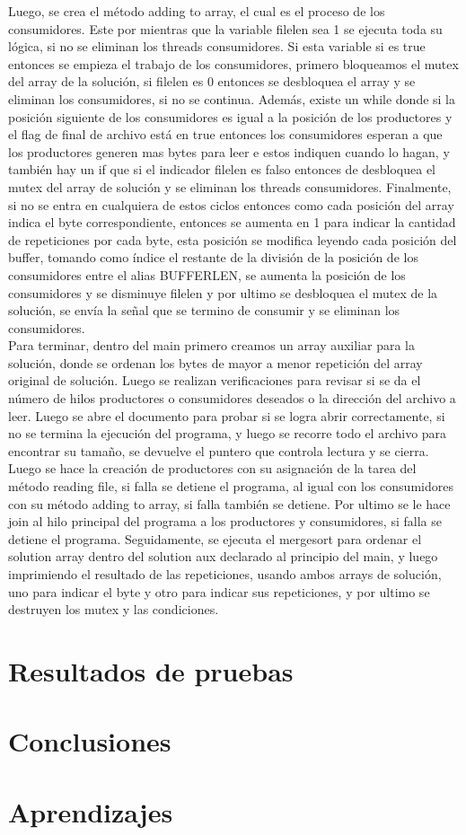 \documentclass[10pt, article, natbib]{IEEEtran}
\begin{document}
Luego, se crea el método adding to array, el cual es el proceso de los consumidores. Este por mientras que la variable filelen sea 1 se ejecuta toda su lógica, si no se eliminan los threads consumidores. Si esta variable si es true entonces se empieza el trabajo de los consumidores, primero bloqueamos el mutex del array de la solución, si filelen es 0 entonces se desbloquea el array y se eliminan los consumidores, si no se continua. Además, existe un while donde si la posición siguiente de los consumidores es igual a la posición de los productores y el flag de final de archivo está en true entonces los consumidores esperan a que los productores generen mas bytes para leer e estos indiquen cuando lo hagan, y también hay un if que si el indicador filelen es falso entonces de desbloquea el mutex del array de solución y se eliminan los threads consumidores. Finalmente, si no se entra en cualquiera de estos ciclos entonces como cada posición del array indica el byte correspondiente, entonces se aumenta en 1 para indicar la cantidad de repeticiones por cada byte, esta posición se modifica leyendo cada posición del buffer, tomando como índice el restante de la división de la posición de los consumidores entre el alias BUFFERLEN, se aumenta la posición de los consumidores y se disminuye filelen y por ultimo se desbloquea el mutex de la solución, se envía la señal que se termino de consumir y se eliminan los consumidores.\\

Para terminar, dentro del main primero creamos un array auxiliar para la solución, donde se ordenan los bytes de mayor a menor repetición del array original de solución. Luego se realizan verificaciones para revisar si se da el número de hilos productores o consumidores deseados o la dirección del archivo a leer. Luego se abre el documento para probar si se logra abrir correctamente, si no se termina la ejecución del programa, y luego se recorre todo el archivo para encontrar su tamaño, se devuelve el puntero que controla lectura y se cierra. Luego se hace la creación de productores con su asignación de la tarea del método reading file, si falla se detiene el programa, al igual con los consumidores con su método adding to array, si falla también se detiene. Por ultimo se le hace join al hilo principal del programa a los productores y consumidores, si falla se detiene el programa.\cite{kerrisk_2010_pthread_join3} Seguidamente, se ejecuta el mergesort para ordenar el solution array dentro del solution aux declarado al principio del main, y luego imprimiendo el resultado de las repeticiones, usando ambos arrays de solución, uno para indicar el byte y otro para indicar sus repeticiones, y por ultimo se destruyen los mutex y las condiciones.\\

\section{Resultados de pruebas}

\section{Conclusiones}

\section{Aprendizajes}

\newpage
\onecolumn
 

\end{document}

